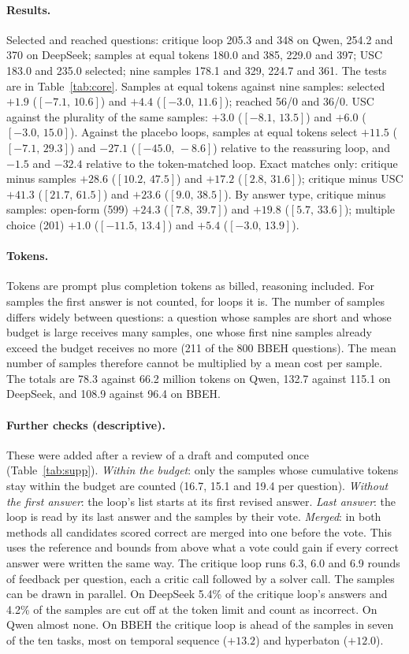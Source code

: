 \documentclass[11pt]{article}
\newcommand{\ds}{DeepSeek}
\newcommand{\qw}{Qwen}
\newcommand{\ci}[2]{$[#1,\,#2]$}
\begin{document}
\paragraph{Results.}
Selected and reached questions: critique loop 205.3 and 348 on \qw, 254.2 and 370 on \ds; samples at equal tokens 180.0 and 385, 229.0 and 397; USC 183.0 and 235.0 selected; nine samples 178.1 and 329, 224.7 and 361.
The tests are in Table~\ref{tab:core}.
Samples at equal tokens against nine samples: selected $+1.9$ (\ci{-7.1}{10.6}) and $+4.4$ (\ci{-3.0}{11.6}); reached 56/0 and 36/0.
USC against the plurality of the same samples: $+3.0$ (\ci{-8.1}{13.5}) and $+6.0$ (\ci{-3.0}{15.0}).
Against the placebo loops, samples at equal tokens select $+11.5$ (\ci{-7.1}{29.3}) and $-27.1$ (\ci{-45.0}{-8.6}) relative to the reassuring loop, and $-1.5$ and $-32.4$ relative to the token-matched loop.
Exact matches only: critique minus samples $+28.6$ (\ci{10.2}{47.5}) and $+17.2$ (\ci{2.8}{31.6}); critique minus USC $+41.3$ (\ci{21.7}{61.5}) and $+23.6$ (\ci{9.0}{38.5}).
By answer type, critique minus samples: open-form (599) $+24.3$ (\ci{7.8}{39.7}) and $+19.8$ (\ci{5.7}{33.6}); multiple choice (201) $+1.0$ (\ci{-11.5}{13.4}) and $+5.4$ (\ci{-3.0}{13.9}).

\paragraph{Tokens.}
Tokens are prompt plus completion tokens as billed, reasoning included. For samples the first answer is not counted, for loops it is.
The number of samples differs widely between questions: a question whose samples are short and whose budget is large receives many samples, one whose first nine samples already exceed the budget receives no more (211 of the 800 BBEH questions).
The mean number of samples therefore cannot be multiplied by a mean cost per sample.
The totals are 78.3 against 66.2 million tokens on \qw, 132.7 against 115.1 on \ds, and 108.9 against 96.4 on BBEH.

\paragraph{Further checks (descriptive).}
These were added after a review of a draft and computed once (Table~\ref{tab:supp}).
\emph{Within the budget}: only the samples whose cumulative tokens stay within the budget are counted (16.7, 15.1 and 19.4 per question).
\emph{Without the first answer}: the loop's list starts at its first revised answer.
\emph{Last answer}: the loop is read by its last answer and the samples by their vote.
\emph{Merged}: in both methods all candidates scored correct are merged into one before the vote. This uses the reference and bounds from above what a vote could gain if every correct answer were written the same way.
The critique loop runs 6.3, 6.0 and 6.9 rounds of feedback per question, each a critic call followed by a solver call. The samples can be drawn in parallel.
On \ds{} 5.4\% of the critique loop's answers and 4.2\% of the samples are cut off at the token limit and count as incorrect. On \qw{} almost none.
On BBEH the critique loop is ahead of the samples in seven of the ten tasks, most on temporal sequence ($+13.2$) and hyperbaton ($+12.0$).
\end{document}

